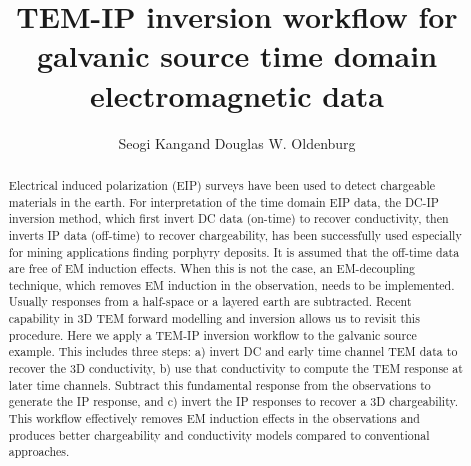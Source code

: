 \documentclass[paper]{geophysics}
\begin{document}
\title{TEM-IP inversion workflow for galvanic source time domain electromagnetic data}

\renewcommand{\thefootnote}{\fnsymbol{footnote}}


\address{
\footnotemark[1]Geophyscial Inversion Facility, \\
University of British Columbia, Canada\\
BC, Vancouver}

\author{Seogi Kang\footnotemark[1] and Douglas W. Oldenburg}

\maketitle

\begin{abstract}
Electrical induced polarization (EIP) surveys have been used to detect chargeable materials in the earth. For interpretation of the time domain EIP data, the DC-IP inversion method, which first invert DC data (on-time) to recover conductivity, then inverts IP data (off-time) to recover chargeability, has been successfully used especially for mining applications finding porphyry deposits. It is assumed that the off-time data are free of EM induction effects. When this is not the case, an EM-decoupling technique, which removes EM induction in the observation, needs to be implemented. Usually responses from a half-space or a layered earth are subtracted. Recent capability in 3D TEM forward modelling and inversion allows us to revisit this procedure. Here we apply a TEM-IP inversion workflow to the galvanic source example. This includes three steps: a) invert DC and early time channel TEM data to recover the 3D conductivity, b) use that conductivity to compute the TEM response at later time channels. Subtract this fundamental response from the observations to generate the IP response, and c) invert the IP responses to recover a 3D chargeability. This workflow effectively removes EM induction effects in the observations and produces better chargeability and conductivity models compared to conventional approaches.
\end{abstract}

\renewcommand{\figdir}{Figures} %
\graphicspath{{./Figures/}}
\end{document}

